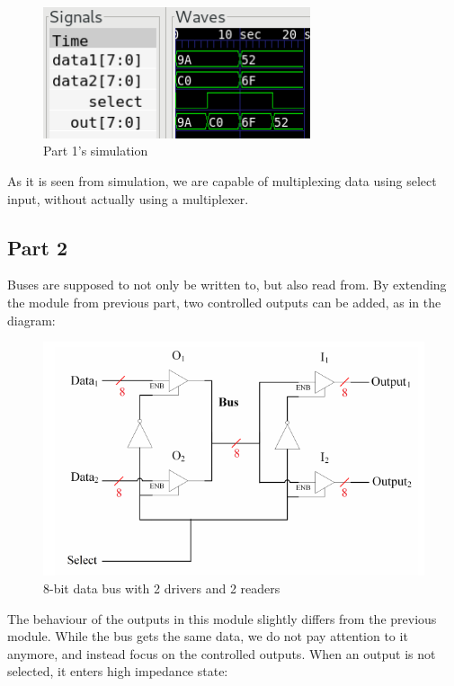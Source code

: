 \documentclass[pdftex,12pt,a4paper]{article}
\begin{document}
\begin{figure}[H]
\centering
\includegraphics[width=0.7\textwidth]{part1_wave.png}
\caption{Part 1's simulation}
\end{figure}

As it is seen from simulation, we are capable of multiplexing data using select input, without actually using a multiplexer.

\subsection{Part 2}
Buses are supposed to not only be written to, but also read from. By extending the module from previous part, two controlled outputs can be added, as in the diagram:

\begin{figure}[H]
\centering
\includegraphics[width=\textwidth]{part2_original.png}
\caption{8-bit data bus with 2 drivers and 2 readers}
\end{figure}

The behaviour of the outputs in this module slightly differs from the previous module. While the bus gets the same data, we do not pay attention to it anymore, and instead focus on the controlled outputs. When an output is not selected, it enters high impedance state:
\end{document}
